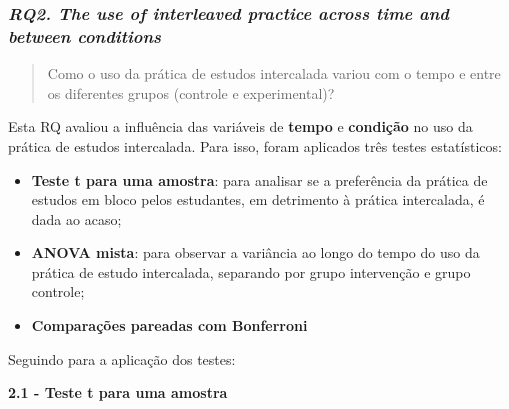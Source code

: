 \documentclass[
]{article}
\newenvironment{Shaded}{\begin{snugshade}}{\end{snugshade}}
\newcommand{\AttributeTok}[1]{\textcolor[rgb]{0.13,0.29,0.53}{#1}}
\newcommand{\CommentTok}[1]{\textcolor[rgb]{0.56,0.35,0.01}{\textit{#1}}}
\newcommand{\DecValTok}[1]{\textcolor[rgb]{0.00,0.00,0.81}{#1}}
\newcommand{\FunctionTok}[1]{\textcolor[rgb]{0.13,0.29,0.53}{\textbf{#1}}}
\newcommand{\NormalTok}[1]{#1}
\newcommand{\OtherTok}[1]{\textcolor[rgb]{0.56,0.35,0.01}{#1}}
\newcommand{\SpecialCharTok}[1]{\textcolor[rgb]{0.81,0.36,0.00}{\textbf{#1}}}
\newcommand{\StringTok}[1]{\textcolor[rgb]{0.31,0.60,0.02}{#1}}
\begin{document}
\subsubsection{\texorpdfstring{\emph{RQ2. The use of interleaved
practice across time and between
conditions}}{RQ2. The use of interleaved practice across time and between conditions}}\label{rq2.-the-use-of-interleaved-practice-across-time-and-between-conditions}

\begin{quote}
Como o uso da prática de estudos intercalada variou com o tempo e entre
os diferentes grupos (controle e experimental)?
\end{quote}

Esta RQ avaliou a influência das variáveis de \textbf{tempo} e
\textbf{condição} no uso da prática de estudos intercalada. Para isso,
foram aplicados três testes estatísticos:

\begin{itemize}
\item
  \textbf{Teste t para uma amostra}: para analisar se a preferência da
  prática de estudos em bloco pelos estudantes, em detrimento à prática
  intercalada, é dada ao acaso;
\item
  \textbf{ANOVA mista}: para observar a variância ao longo do tempo do
  uso da prática de estudo intercalada, separando por grupo intervenção
  e grupo controle;
\item
  \textbf{Comparações pareadas com Bonferroni}
\end{itemize}

Seguindo para a aplicação dos testes:

\textbf{2.1 - Teste t para uma amostra}

\begin{Shaded}
\end{Shaded}
\end{document}
